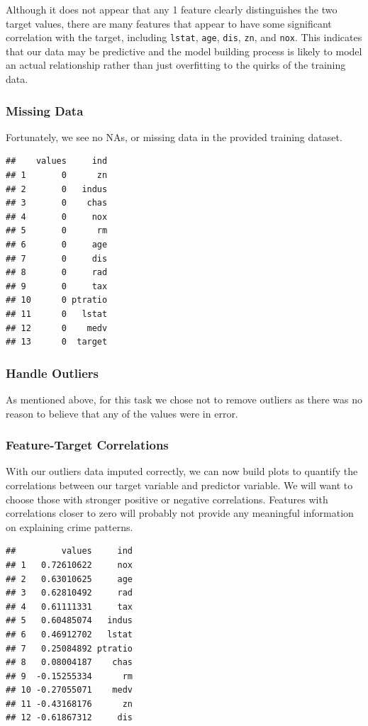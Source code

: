 \documentclass[
]{article}
\begin{document}
Although it does not appear that any 1 feature clearly distinguishes the
two target values, there are many features that appear to have some
significant correlation with the target, including \texttt{lstat},
\texttt{age}, \texttt{dis}, \texttt{zn}, and \texttt{nox}. This
indicates that our data may be predictive and the model building process
is likely to model an actual relationship rather than just overfitting
to the quirks of the training data.

\hypertarget{missing-data}{%
\subsubsection{Missing Data}\label{missing-data}}

Fortunately, we see no NAs, or missing data in the provided training
dataset.

\begin{verbatim}
##    values     ind
## 1       0      zn
## 2       0   indus
## 3       0    chas
## 4       0     nox
## 5       0      rm
## 6       0     age
## 7       0     dis
## 8       0     rad
## 9       0     tax
## 10      0 ptratio
## 11      0   lstat
## 12      0    medv
## 13      0  target
\end{verbatim}

\hypertarget{handle-outliers}{%
\subsubsection{Handle Outliers}\label{handle-outliers}}

As mentioned above, for this task we chose not to remove outliers as
there was no reason to believe that any of the values were in error.

\hypertarget{feature-target-correlations}{%
\subsubsection{Feature-Target
Correlations}\label{feature-target-correlations}}

With our outliers data imputed correctly, we can now build plots to
quantify the correlations between our target variable and predictor
variable. We will want to choose those with stronger positive or
negative correlations. Features with correlations closer to zero will
probably not provide any meaningful information on explaining crime
patterns.

\begin{verbatim}
##         values     ind
## 1   0.72610622     nox
## 2   0.63010625     age
## 3   0.62810492     rad
## 4   0.61111331     tax
## 5   0.60485074   indus
## 6   0.46912702   lstat
## 7   0.25084892 ptratio
## 8   0.08004187    chas
## 9  -0.15255334      rm
## 10 -0.27055071    medv
## 11 -0.43168176      zn
## 12 -0.61867312     dis
\end{verbatim}
\end{document}
